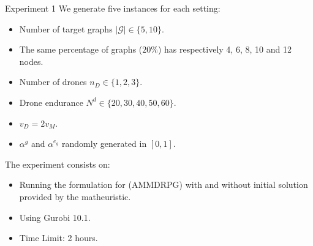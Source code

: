 \documentclass[slidestop,usepdftitle=false,10pt]{beamer}
\begin{document}
	\begin{frame}{Experiment 1}
    We generate five instances for each setting:
    \begin{itemize}
        \item Number of target graphs $|\mathcal G|\in\{5, 10\}$.
        \item The same percentage of graphs ($20\%$) has respectively 4, 6, 8, 10 and 12 nodes.
        \item Number of drones $n_D\in\{1, 2, 3\}.$
        \item Drone endurance $N^d\in\{20, 30, 40, 50, 60\}$.
        \item $v_D= 2v_M$.
        \item $\alpha^g$ and $\alpha^{e_g}$ randomly generated in $[0, 1]$.
    \end{itemize}
    
    The experiment consists on:
    \begin{itemize}
        \item Running the formulation for (AMMDRPG) with and without initial solution provided by the matheuristic.
        \item Using Gurobi 10.1.
        \item Time Limit: 2 hours.
    \end{itemize}
    \end{frame}
	
\end{document}
